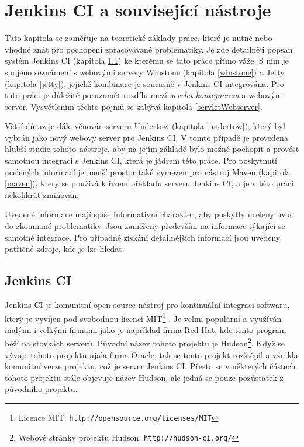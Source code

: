 \chapter{Jenkins CI a související nástroje}
    Tato kapitola se zaměřuje na teoretické základy práce, které je nutné nebo vhodné znát pro pochopení zpracovávané problematiky.
    Je zde detailněji popsán systém Jenkins CI (kapitola \ref{jenkins}) ke kterému se tato práce přímo váže. S ním je spojeno seznámení
    s webovými servery Winstone (kapitola \ref{winstone}) a Jetty (kapitola \ref{jetty}), jejichž kombinace je současně v Jenkins CI integrována.
    Pro tuto práci je důležité poruzumět rozdílu mezí \emph{servlet kontejnerem} a webovým server. Vysvětlením těchto pojmů se zabývá kapitola \ref{servletWebserver}.

    Větší důraz je dále věnován serveru Undertow (kapitola \ref{undertow}), který byl vybrán jako nový webový server pro Jenkins CI. V tomto případě je provedena hlubší studie
    tohoto nástroje, aby na jejím základě bylo možné pochopit a provést samotnou integraci s Jenkins CI, která je jádrem této práce. 
    Pro poskytnutí ucelených informací
    je menší prostor také vymezen pro nástroj Maven (kapitola \ref{maven}), který se používá k řízení překladu serveru Jenkins CI, a je v této práci několikrát zmiňován. 

    Uvedené informace mají spíše informativní charakter, aby poskytly ucelený úvod do zkoumané problematiky. Jsou zaměřeny především na informace týkající se samotné
    integrace. Pro případné získání detailnějších informací jsou uvedeny patřičné zdroje, kde je lze hledat.

    \section {Jenkins CI} \label{jenkins}
        Jenkins CI je komunitní open source nástroj pro kontinuální integraci softwaru, který je vyvíjen pod svobodnou licencí
        MIT\footnote{Licence MIT: \texttt{http://opensource.org/licenses/MIT}} \cite{jenkinsGovernance}.
        Je velmi populární a využíván malými i velkými firmami jako je například firma Red Hat, kde tento program běží na stovkách serverů.
        Původní název tohoto projektu je Hudson\footnote{Webové stránky projektu Hudson: \texttt{http://hudson-ci.org/}}. 
        Když se vývoje tohoto projektu ujala firma Oracle, tak se tento projekt
        rozštěpil a vznikla komunitní verze projektu, což je server Jenkins CI. Přesto se v některých částech tohoto projektu 
        stále objevuje název Hudson, ale jedná se pouze pozůstatek z původního projektu.

